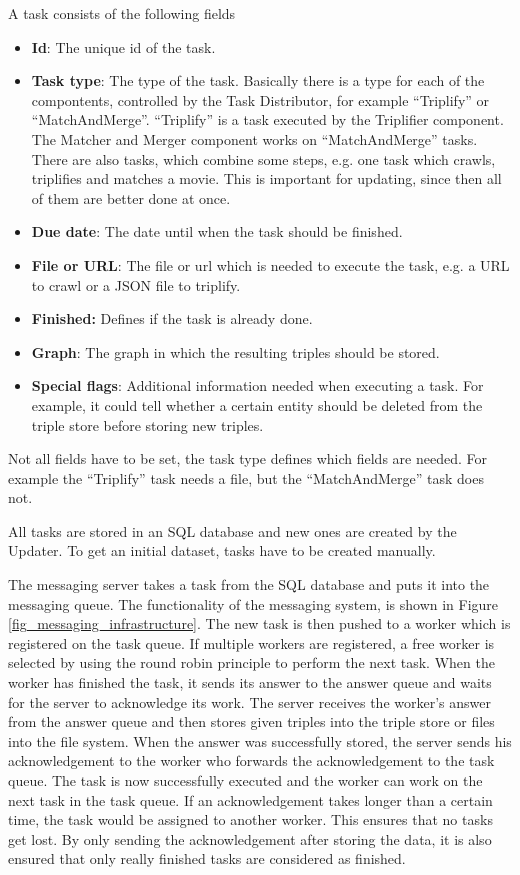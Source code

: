 A task consists of the following fields
\begin{itemize}
  \item \textbf{Id}:
  The unique id of the task.
  \item \textbf{Task type}:
   The type of the task.
  Basically there is a type for each of the compontents, controlled by the Task Distributor, for example ``Triplify'' or ``MatchAndMerge''.
  ``Triplify'' is a task executed by the Triplifier component.
  The Matcher and Merger component works on ``MatchAndMerge'' tasks.
  There are also tasks, which combine some steps, e.g. one task which crawls, triplifies and matches a movie. This is important for updating, since then all of them are better done at once.
  \item \textbf{Due date}:
  The date until when the task should be finished.
  \item \textbf{File or URL}:
  The file or url which is needed to execute the task, e.g. a URL to crawl or a JSON file to triplify.
  \item \textbf{Finished:}
  Defines if the task is already done.
  \item \textbf{Graph}:
  The graph in which the resulting triples should be stored.
  \item \textbf{Special flags}:
  Additional information needed when executing a task.
  For example, it could tell whether a certain entity should be deleted from the triple store before storing new triples.
\end{itemize}
Not all fields have to be set, the task type defines which fields are needed.
For example the ``Triplify'' task needs a file, but the ``MatchAndMerge'' task does not.

All tasks are stored in an SQL database and new ones are created by the Updater.
To get an initial dataset, tasks have to be created manually.

The messaging server takes a task from the SQL database and puts it into the messaging queue.
The functionality of the messaging system, is shown in Figure \ref{fig_messaging_infrastructure}.
The new task is then pushed to a worker which is registered on the task queue.
If multiple workers are registered, a free worker is selected by using the round robin principle to perform the next task.
When the worker has finished the task, it sends its answer to the answer queue and waits for the server to acknowledge its work.
The server receives the worker's answer from the answer queue and then stores given triples into the triple store or files into the file system.
When the answer was successfully stored, the server sends his acknowledgement to the worker who forwards the acknowledgement to the task queue.
The task is now successfully executed and the worker can work on the next task in the task queue.
If an acknowledgement takes longer than a certain time, the task would be assigned to another worker.
This ensures that no tasks get lost.
By only sending the acknowledgement after storing the data, it is also ensured that only really finished tasks are considered as finished.

